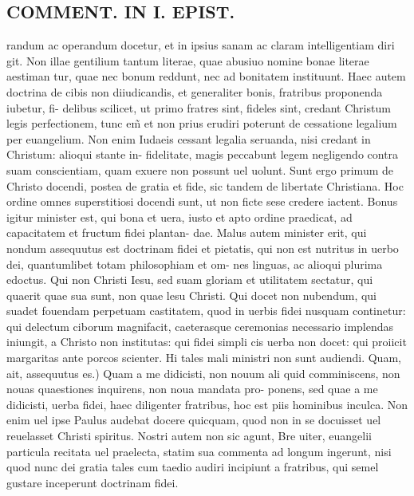 \documentclass{article}
\begin{document}
\begin{pages}
\section*{COMMENT. IN I. EPIST. }
\marginpar{[ p.508 ]}\pstart randum ac operandum docetur, et in ipsius sanam ac claram intelligentiam diri git. Non illae gentilium tantum literae, quae abusiuo nomine bonae literae aestiman tur, quae nec bonum reddunt, nec ad bonitatem instituunt. Haec autem doctrina de cibis non diiudicandis, et generaliter bonis, fratribus proponenda iubetur, fi- delibus scilicet, ut primo fratres sint, fideles sint, credant Christum legis perfectionem, tunc em̃ et non prius erudiri poterunt de cessatione legalium per euangelium. Non enim Iudaeis cessant legalia seruanda, nisi credant in Christum: alioqui stante in- fidelitate, magis peccabunt legem negligendo contra suam conscientiam, quam exuere non possunt uel uolunt. Sunt ergo primum de Christo docendi, postea de gratia et fide, sic tandem de libertate Christiana. Hoc ordine omnes superstitiosi docendi sunt, ut non ficte sese credere iactent. Bonus igitur minister est, qui bona et uera, iusto et apto ordine praedicat, ad capacitatem et fructum fidei plantan- dae. Malus autem minister erit, qui nondum assequutus est doctrinam fidei et pietatis, qui non est nutritus in uerbo dei, quantumlibet totam philosophiam et om- nes linguas, ac alioqui plurima edoctus. Qui non Christi Iesu, sed suam gloriam et utilitatem sectatur, qui quaerit quae sua sunt, non quae lesu Christi. Qui docet non nubendum, qui suadet fouendam perpetuam castitatem, quod in uerbis fidei nusquam continetur: qui delectum ciborum magnifacit, caeterasque ceremonias necessario implendas iniungit, a Christo non institutas: qui fidei simpli cis uerba non docet: qui proiicit margaritas ante porcos scienter. Hi tales mali ministri non sunt audiendi. Quam, ait, assequutus es.) Quam a me didicisti, non nouum ali quid comminiscens, non nouas quaestiones inquirens, non noua mandata pro- ponens, sed quae a me didicisti, uerba fidei, haec diligenter fratribus, hoc est piis hominibus inculca. Non enim uel ipse Paulus audebat docere quicquam, quod non in se docuisset uel reuelasset Christi spiritus. Nostri autem non sic agunt, Bre uiter, euangelii particula recitata uel praelecta, statim sua commenta ad longum ingerunt, nisi quod nunc dei gratia tales cum taedio audiri incipiunt a fratribus, qui semel gustare inceperunt doctrinam fidei.  \pend
{}
{}

\end{pages}
\end{document}
